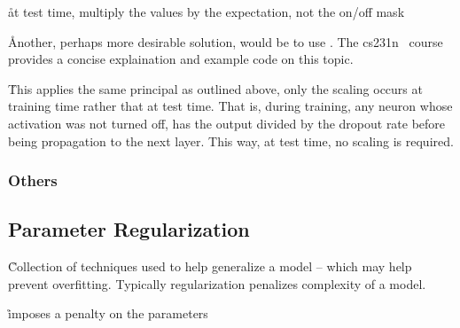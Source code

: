 \r{at test time, multiply the values by the expectation, not the on/off mask}

\r{Another, perhaps more desirable solution, would be to use . The cs231n~\cite{cs231n} course provides a concise explaination and example code on this topic.}

\r{This applies the same principal as outlined above, only the scaling occurs at training time rather that at test time. That is, during training, any neuron whose activation was not turned off, has the output divided by the dropout rate before being propagation to the next layer.  This way, at test time, no scaling is required.}


\subsubsection{Others}











\subsection{Parameter Regularization}

\r{Collection of techniques used to help generalize a model -- which may help prevent overfitting. Typically regularization penalizes complexity of a model.}



\r{imposes a penalty on the parameters}

